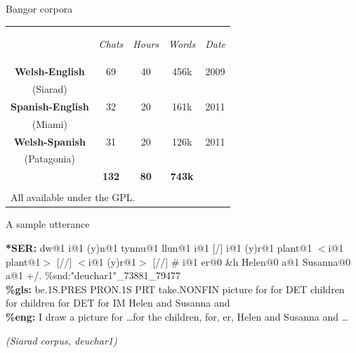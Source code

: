\documentclass[hyperref={pdfpagelabels=false}, 14pt]{beamer}
\begin{document}
\begin{frame}{Bangor corpora}
\begin{center}
\begin{tabular}{ccccc}
& \begin{small}\textit{Chats}\end{small} & \begin{small}\textit{Hours}\end{small} & \begin{small}\textit{Words}\end{small} & \begin{small}\textit{Date}\end{small} \\
\cline{1-5}\noalign{\smallskip}
\textbf{Welsh-English} & 69 & 40 & 456k & 2009 \\
(Siarad) & & & \\
\textbf{Spanish-English} & 32 & 20 & 161k & 2011 \\
(Miami) & & & \\
\textbf{Welsh-Spanish} & 31 & 20 & 126k & 2011 \\
(Patagonia) & & & \\
\hline\noalign{\smallskip}
& \textbf{132} & \textbf{80} & \textbf{743k} \\
\multicolumn{5}{l}{} \\
\multicolumn{5}{l}{All available under the GPL.}
\end{tabular}
\end{center}
\end{frame}


\begin{frame}{A sample utterance}
\begin{footnotesize}
\textbf{*SER:}   dw@1 i@1 (y)n@1 tynnu@1 llun@1 i@1 [/] i@1 (y)r@1 plant@1 $<$i@1 plant@1$>$ [//] $<$i@1 (y)r@1$>$ [//] \# i@1 er@0 \&h Helen@0 a@1 Susanna@0 a@1 +/. \%snd:"deuchar1"\_73881\_79477 \\
\bigskip
\textcolor{ESRCred}{\textbf{\%gls:} be.1S.PRES PRON.1S PRT take.NONFIN picture for for DET children for children for DET for IM Helen and Susanna and} \\
\bigskip
\textbf{\%eng:}   I draw a picture for \dots for the children, for, er, Helen and Susanna and \dots \\
\end{footnotesize}
\begin{small}
\hfill\textit{(Siarad corpus, deuchar1)} \\
\end{small}
\end{frame}
\end{document}
